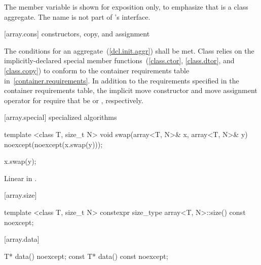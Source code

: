 \pnum
\enternote The member variable  is shown for exposition only,
to emphasize that  is a class aggregate.  The name 
is not part of 's interface. \exitnote

[array.cons]{ constructors, copy, and assignment}

\pnum
{}%
%
The conditions for an aggregate~(\ref{dcl.init.aggr}) shall be
met. Class  relies on the implicitly-declared special
member functions~(\ref{class.ctor}, \ref{class.dtor}, and \ref{class.copy}) to
conform to the container requirements table in~\ref{container.requirements}.
In addition to the requirements specified in the container requirements table,
the implicit move constructor and move assignment operator for 
require that  be  or ,
respectively.

[array.special]{ specialized algorithms}

%
%
\begin{itemdecl}
template <class T, size_t N>
  void swap(array<T, N>& x, array<T, N>& y) noexcept(noexcept(x.swap(y)));
\end{itemdecl}

\begin{itemdescr}
\pnum\effects
\begin{codeblock}
x.swap(y);
\end{codeblock}

\pnum
\complexity Linear in .
\end{itemdescr}

[array.size]{}

%
%
\begin{itemdecl}
template <class T, size_t N> constexpr size_type array<T, N>::size() const noexcept;
\end{itemdecl}

\begin{itemdescr}
\pnum\returns {}
\end{itemdescr}

[array.data]{}
%
%
\begin{itemdecl}
T* data() noexcept;
const T* data() const noexcept;
\end{itemdecl}

